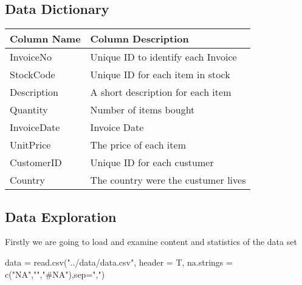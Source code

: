 \hypertarget{data-dictionary}{%
\subsection{Data Dictionary}\label{data-dictionary}}

\begin{longtable}[]{@{}ll@{}}
\toprule
Column Name & Column Description\tabularnewline
\midrule
\endhead
InvoiceNo & Unique ID to identify each Invoice\tabularnewline
StockCode & Unique ID for each item in stock\tabularnewline
Description & A short description for each item\tabularnewline
Quantity & Number of items bought\tabularnewline
InvoiceDate & Invoice Date\tabularnewline
UnitPrice & The price of each item\tabularnewline
CustomerID & Unique ID for each custumer\tabularnewline
Country & The country were the custumer lives\tabularnewline
\bottomrule
\end{longtable}

\hypertarget{data-exploration}{%
\subsection{Data Exploration}\label{data-exploration}}

Firstly we are going to load and examine content and statistics of the
data set

\begin{Schunk}
\begin{Sinput}
data = read.csv("../data/data.csv", header = T, 
                na.strings = c("NA","","#NA"),sep=",")
\end{Sinput}
\end{Schunk}

